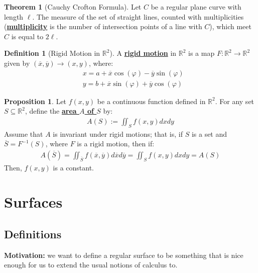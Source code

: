 \documentclass[11pt]{scrartcl}
\newcommand{\R}[0]{\mathbb{R}}
\theoremstyle{definition}
\newtheorem{theorem}{Theorem}
\newtheorem{definition}{Definition}
\newtheorem{prop}{Proposition}
\theoremstyle{remark}
\newcommand{\dfn}[1]{\textbf{\underline{#1}}}
\begin{document}
{\begin{theorem}[Cauchy Crofton Formula]
	Let $C$ be a regular plane curve with length $\ell$. The measure of the set of straight lines, counted with multiplicities (\dfn{multiplicity} is the number of intersection points of a line with $C$), which meet $C$ is equal to $2 \ell$. 
\end{theorem}

\begin{definition}[Rigid Motion in $\R^2$]
	A \dfn{rigid motion} in $\R^2$ is a map $F: \R^2 \rightarrow \R^2$ given by $(\overline{x}, \overline{y}) \rightarrow (x,y)$, where: 
	\begin{align*}
		& x = a + \overline{x} \cos(\varphi) - \overline{y} \sin( \varphi) \\
		& y = b + \overline{x} \sin( \varphi) + \overline{y} \cos (\varphi) 
	\end{align*}
\end{definition}

\begin{prop}
	Let $f(x,y)$ be a continuous function defined in $\R^2$. For any set $S \subseteq \R^2$, define the \dfn{area $A$ of $S$} by: 
	\begin{align}
	A(S) := \iint_{S} f(x,y) dx dy 	
	\end{align}
	Assume that $A$ is invariant under rigid motions; that is, if $S$ is a set and $\overline{S} = F^{-1}(S)$, where $F$ is a rigid motion, then if: 
	\begin{align*}
		A (\overline{S} ) = \iint_{\overline{S}} f(\overline{x}, \overline{y}) d \overline{x} d \overline{y} 	= \iint_{S} f(x,y) dx dy 	= A(S)
	\end{align*}
	Then, $f(x,y)$ is a constant. 
\end{prop}


\section{Surfaces}

\subsection{Definitions}

\textbf{Motivation:} we want to define a regular surface to be something that is nice enough for us to extend the usual notions of calculus to. 


}
\end{document}
